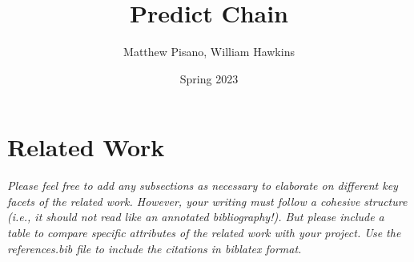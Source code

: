\documentclass{article}
\title{Predict Chain}
\author{Matthew Pisano, William Hawkins}
\date{Spring 2023}
\begin{document}
\maketitle

\section*{Related Work}
\emph{Please feel free to add any subsections as necessary to elaborate on different key facets of the related work.
However, your writing must follow a cohesive structure (i.e., it should not read like an annotated bibliography!).
But please include a table to compare specific attributes of the related work with your project.
Use the references.bib file to include the citations in biblatex format.
}
\cite{test}



\end{document}
